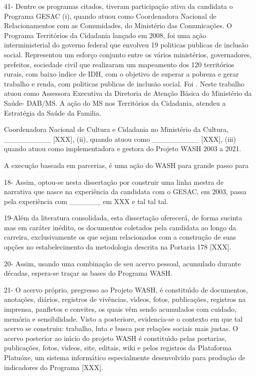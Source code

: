 \documentclass[
12pt,		%
openright,	%
twoside,  %
a4paper,			%
chapter=TITLE,		%
english,			%
french,				%
spanish,			%
brazil				%
]{USPSC-classe/USPSC}
\begin{document}
41- Dentre os  programas citados, tiveram participa\c{c}\~ao ativa da candidata o Programa GESAC (i), quando atuou como Coordenadora  Nacional de Relacionamentos com as Comunidades, do Minist\'erio das Comunica\c{c}\~oes. O Programa Territ\'orios da Cidadania lan\c{c}ado em 2008, foi  uma a\c{c}\~ao interministerial do governo federal que envolveu 19 politicas publicas de inclus\~ao social. Representou um esfor\c{c}o conjunto entre os v\'arios minist\'erios, governadores, prefeitos, sociedade civil que realizaram um mapeamento dos 120   territ\'orios rurais, com baixo \'{\i}ndice de IDH, com o objetivo de superar a pobreza e gerar trabalho e renda, com politicas publicas de inclus\~ao social. Foi . Neste  trabalho atuou como Assessora Executiva da Diretoria de Aten\c{c}\~ao B\'asica do Minist\'erio da Sa\'ude- DAB/MS. A a\c{c}\~ao do MS nos Territ\'orios da Cidadania, atendeu  a Estrat\'egia da Sa\'ude da Familia.  




Coordenadora Nacional de Cultura e Cidadania no Minist\'erio da Cultura,   \_\_\_\_\_\_\_\_\_ [XXX], (ii), quando atuou como \_\_\_\_\_\_\_\_\_ [XXX], (iii) quando atuou como implementadora e gestora do Projeto WASH 2003 a 2021.




A execu\c{c}\~ao baseada em parcerias, \'e uma a\c{c}\~ao do WASH para grande passo para




18-  Assim, optou-se nesta disserta\c{c}\~ao por construir uma linha mestra de narrativa que nasce na experi\^encia da candidata com o GESAC, em 2003, passa pela experi\^encia com \_\_\_\_\_\_ em XXX e tal tal tal.




 19-Al\'em da literatura consolidada, esta disserta\c{c}\~ao oferecer\'a, de forma sucinta mas em car\'ater in\'edito, os documentos coletados pela candidata ao longo da carreira, exclusivamente os que sejam relacionados com a constru\c{c}\~ao de suas op\c{c}\~oes no estabelecimento da metodologia descrita na Portaria 178 [XXX].




20- Assim, usando uma combina\c{c}\~ao de seu acervo pessoal, acumulado durante d\'ecadas, espera-se tra\c{c}ar as bases do Programa WASH.




21-  O acervo pr\'oprio, pregresso ao Projeto WASH, \'e constitu\'{\i}do de documentos, anota\c{c}\~oes, di\'arios, registros de viv\^encias, v\'{\i}deos, fotos, publica\c{c}\~oes, registros na imprensa, panfletos e convites, os quais v\^em sendo acumulados com cuidado, mem\'oria e sensibilidade. Visto a posteriore, evidencia-se o contexto em que tal acervo se construiu: trabalho, luta e busca por rela\c{c}\~oes sociais mais justas. O acervo posterior ao in\'{\i}cio do projeto WASH \'e constitu\'{\i}do pelas portarias, publica\c{c}\~oes, fotos, v\'{\i}deos, site, editais, wiki e pelos registros da Plataforma Platu\'oxe, um sistema inform\'atico especialmente desenvolvido para produ\c{c}\~ao de indicadores do Programa [XXX].
\end{document}
